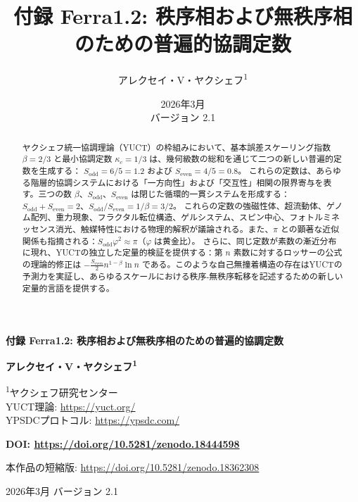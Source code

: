 \documentclass[11pt,a4paper]{article}
\begin{document}
	
	\title{付録 Ferra1.2: 秩序相および無秩序相のための普遍的協調定数}
	\author{アレクセイ・V・ヤクシェフ\textsuperscript{1}}
	\date{2026年3月 \\ バージョン 2.1}
	
	\begin{titlepage}
		\begin{center}
			\vspace*{0.5cm}
			\Huge\textbf{付録 Ferra1.2: 秩序相および無秩序相のための普遍的協調定数}
			\vspace{0.8cm}
			
			\Large\textbf{アレクセイ・V・ヤクシェフ\textsuperscript{1}}
			\vspace{0.3cm}
			
			\large
			\textsuperscript{1}ヤクシェフ研究センター \\
			YUCT理論: \url{https://yuct.org/} \\
			YPSDCプロトコル: \url{https://ypsdc.com/}
			\vspace{0.5cm}
			
			\textbf{DOI: \url{https://doi.org/10.5281/zenodo.18444598}}
			\vspace{0.3cm}
			
			\large
			本作品の短縮版: \url{https://doi.org/10.5281/zenodo.18362308}
			\vspace{0.3cm}
			
			\large
			2026年3月 \; バージョン 2.1
			\vspace{0.5cm}
			
			\begin{minipage}{0.92\textwidth}
				\small
				\begin{abstract}
					\noindent
					ヤクシェフ統一協調理論（YUCT）の枠組みにおいて、基本誤差スケーリング指数 \(\beta = 2/3\) と最小協調定数 \(\kappa_c = 1/3\) は、幾何級数の総和を通じて二つの新しい普遍的定数を生成する：
					\(S_{\text{odd}} = 6/5 = 1.2\) および \(S_{\text{even}} = 4/5 = 0.8\)。
					これらの定数は、あらゆる階層的協調システムにおける「一方向性」および「交互性」相関の限界寄与を表す。三つの数 \(\beta\)、\(S_{\text{odd}}\)、\(S_{\text{even}}\) は閉じた循環的一貫システムを形成する：
					\(S_{\text{odd}}+S_{\text{even}} = 2\)、\(S_{\text{odd}}/S_{\text{even}} = 1/\beta = 3/2\)。
					これらの定数の強磁性体、超流動体、ゲノム配列、重力現象、フラクタル転位構造、ゲルシステム、スピン中心、フォトルミネッセンス消光、触媒特性における物理的解釈が議論される。また、\(\pi\) との顕著な近似関係も指摘される：\(S_{\text{odd}}\varphi^2 \approx \pi\)（\(\varphi\) は黄金比）。
					さらに、同じ定数が素数の漸近分布に現れ、YUCTの独立した定量的検証を提供する：第 \(n\) 素数に対するロッサーの公式の理論的修正は \(-\frac{S_{\text{even}}}{2}n^{1-\beta}\ln n\) である。このような自己無撞着構造の存在はYUCTの予測力を実証し、あらゆるスケールにおける秩序-無秩序転移を記述するための新しい定量的言語を提供する。
				\end{abstract}
			\end{minipage}
			

\end{center}
\end{titlepage}
\end{document}
